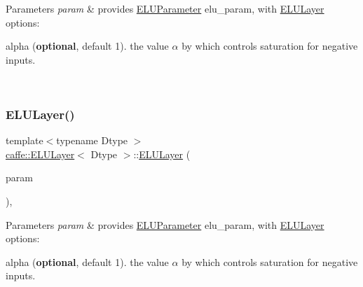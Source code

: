 \begin{DoxyParams}{Parameters}
{\em param} & provides \mbox{\hyperlink{classcaffe_1_1_e_l_u_parameter}{E\+L\+U\+Parameter}} elu\+\_\+param, with \mbox{\hyperlink{classcaffe_1_1_e_l_u_layer}{E\+L\+U\+Layer}} options\+:
\begin{DoxyItemize}
\item alpha ({\bfseries optional}, default 1). the value $ \alpha $ by which controls saturation for negative inputs. 
\end{DoxyItemize}\\
\hline
\end{DoxyParams}
\mbox{\label{classcaffe_1_1_e_l_u_layer_af0b475c3d3b68f6daf7e2edcb7d5b97a}} 
\subsubsection{\texorpdfstring{E\+L\+U\+Layer()}{ELULayer()}\hspace{0.1cm}{\footnotesize\ttfamily [2/2]}}
{\footnotesize\ttfamily template$<$typename Dtype $>$ \\
\mbox{\hyperlink{classcaffe_1_1_e_l_u_layer}{caffe\+::\+E\+L\+U\+Layer}}$<$ Dtype $>$\+::\mbox{\hyperlink{classcaffe_1_1_e_l_u_layer}{E\+L\+U\+Layer}} (\begin{DoxyParamCaption}\item[{const \mbox{\hyperlink{classcaffe_1_1_layer_parameter}{Layer\+Parameter}} \&}]{param }\end{DoxyParamCaption})\hspace{0.3cm}{\ttfamily [inline]}, {\ttfamily [explicit]}}


\begin{DoxyParams}{Parameters}
{\em param} & provides \mbox{\hyperlink{classcaffe_1_1_e_l_u_parameter}{E\+L\+U\+Parameter}} elu\+\_\+param, with \mbox{\hyperlink{classcaffe_1_1_e_l_u_layer}{E\+L\+U\+Layer}} options\+:
\begin{DoxyItemize}
\item alpha ({\bfseries optional}, default 1). the value $ \alpha $ by which controls saturation for negative inputs. 
\end{DoxyItemize}\\
\hline
\end{DoxyParams}


